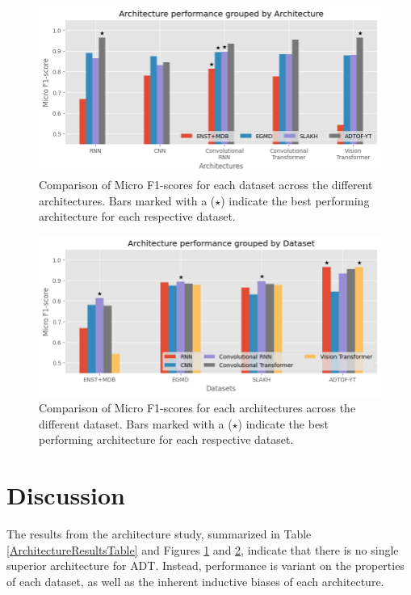 \begin{figure}[H]
    \centering
    \hspace*{-0.8cm}
    \includegraphics[scale=0.8]{figures/architectureperformancearchitecture.png}
    \caption{Comparison of Micro F1-scores for each dataset across the different architectures. Bars marked with a ($\star$) indicate the best performing architecture for each respective dataset.}
    \label{ArchitectureResultsArchitectureFigure}
\end{figure}

\begin{figure}[H]
    \centering
    \hspace*{-0.8cm}
    \includegraphics[scale=0.8]{figures/architectureperformancedataset.png}
    \caption{Comparison of Micro F1-scores for each architectures across the different dataset. Bars marked with a ($\star$) indicate the best performing architecture for each respective dataset.}
    \label{ArchitectureResultsDatasetFigure}
\end{figure}

\section{Discussion}

The results from the architecture study, summarized in Table \ref{ArchitectureResultsTable} and Figures \ref{ArchitectureResultsArchitectureFigure} and \ref{ArchitectureResultsDatasetFigure}, indicate that there is no single superior architecture for \gls{ADT}. Instead, performance is variant on the properties of each dataset, as well as the inherent inductive biases of each architecture.


